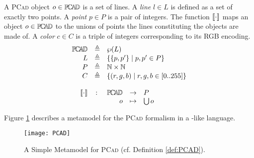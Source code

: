 \begin{Definition}
   A \textsc{PCad} object $o\in \mathbb{P}\!\mathbb{C}\!\mathbb{A}\!\mathbb{D} $ is a set of lines. A \emph{line} $l 
\in L$ is defined as a set of exactly two points. A \emph{point} $p\in P$ is a 
pair of integers. The function $\llbracket \cdot \rrbracket$ maps an object $o\in \mathbb{P}\!\mathbb{C}\!\mathbb{A}\!\mathbb{D} $ to the 
unions of points the lines constituting the objects are made of. A \emph{color} 
$c\in C$ is a triple of integers corresponding to its RGB encoding.
\begin{displaymath}
   \begin{array}{rcl}
      \PCAD &\eqdef& \wp(L)\\
      L     &\eqdef& \{ \{p, p'\} \;|\; p, p' \in P \}\\
      P     &\eqdef& \mathbb{N} \times \mathbb{N}\\
      C     &\eqdef& \{ (r, g, b) \;|\; r, g, b \in [0..255] \}\\
      \\
      \SMapping & \colon & \!\!\!\begin{array}[t]{rcl}
         \PCAD &\to& P\\
         o &\mapsto& \bigcup o
      \end{array}
   \end{array}
\end{displaymath}
\end{Definition}
Figure \ref{fig:PCAD} describes a metamodel for the \textsc{PCad} formalism in 
a \MOF-like language. 

\begin{figure}[t]
   \centering
   \texttt{[image: PCAD]}
   \caption{A Simple Metamodel for \textsc{PCad} (cf. Definition 
\ref{def:PCAD}).}%
   \label{fig:PCAD}%
\end{figure}
